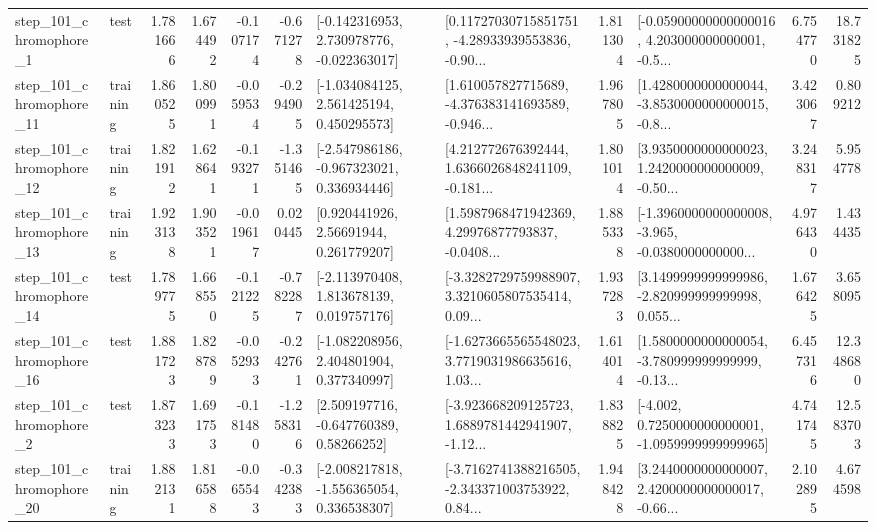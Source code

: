 \begin{tabular}{llrrrrllrlrr}
   step\_101\_chromophore\_1 &      test &      1.781666 &    1.674492 &     -0.107174 & -0.671278 &   [-0.142316953, 2.730978776, -0.022363017] &  [0.11727030715851751, -4.28933939553836, -0.90... &       1.811304 &  [-0.05900000000000016, 4.203000000000001, -0.5... &            6.754770 &         18.731825 \\
  step\_101\_chromophore\_11 &  training &      1.860525 &    1.800991 &     -0.059534 & -0.294905 &    [-1.034084125, 2.561425194, 0.450295573] &  [1.610057827715689, -4.376383141693589, -0.946... &       1.967805 &  [1.4280000000000044, -3.8530000000000015, -0.8... &            3.423067 &          0.809212 \\
  step\_101\_chromophore\_12 &  training &      1.821912 &    1.628641 &     -0.193271 & -1.351465 &   [-2.547986186, -0.967323021, 0.336934446] &  [4.212772676392444, 1.6366026848241109, -0.181... &       1.801014 &  [3.9350000000000023, 1.2420000000000009, -0.50... &            3.248317 &          5.954778 \\
  step\_101\_chromophore\_13 &  training &      1.923138 &    1.903521 &     -0.019617 &  0.020445 &      [0.920441926, 2.56691944, 0.261779207] &  [1.5987968471942369, 4.29976877793837, -0.0408... &       1.885338 &  [-1.3960000000000008, -3.965, -0.0380000000000... &            4.976430 &          1.434435 \\
  step\_101\_chromophore\_14 &      test &      1.789775 &    1.668550 &     -0.121225 & -0.782287 &    [-2.113970408, 1.813678139, 0.019757176] &  [-3.3282729759988907, 3.3210605807535414, 0.09... &       1.937283 &  [3.1499999999999986, -2.820999999999998, 0.055... &            1.676425 &          3.658095 \\
  step\_101\_chromophore\_16 &      test &      1.881723 &    1.828789 &     -0.052933 & -0.242761 &    [-1.082208956, 2.404801904, 0.377340997] &  [-1.6273665565548023, 3.7719031986635616, 1.03... &       1.614014 &  [1.5800000000000054, -3.780999999999999, -0.13... &            6.457316 &         12.348680 \\
   step\_101\_chromophore\_2 &      test &      1.873233 &    1.691753 &     -0.181480 & -1.258316 &     [2.509197716, -0.647760389, 0.58266252] &  [-3.923668209125723, 1.6889781442941907, -1.12... &       1.838825 &  [-4.002, 0.7250000000000001, -1.0959999999999965] &            4.741745 &         12.583703 \\
  step\_101\_chromophore\_20 &  training &      1.882131 &    1.816588 &     -0.065543 & -0.342383 &   [-2.008217818, -1.556365054, 0.336538307] &  [-3.7162741388216505, -2.343371003753922, 0.84... &       1.948428 &  [3.2440000000000007, 2.4200000000000017, -0.66... &            2.102895 &          4.674598 \\

\end{tabular}

